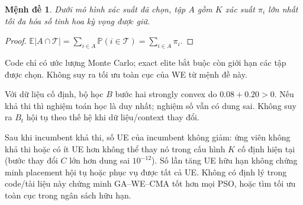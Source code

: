 \documentclass[11pt,a4paper]{article}
\newcommand{\E}{\mathbb E}
\newcommand{\Prob}{\mathbb P}
\newtheorem{proposition}{Mệnh đề}
\begin{document}
\begin{proposition}
Dưới mô hình xác suất đã chọn, tập $A$ gồm $K$ xác suất $\pi_i$ lớn nhất tối đa hóa số tinh hoa kỳ vọng được giữ.
\end{proposition}
\begin{proof}$\E|A\cap\mathcal T|=\sum_{i\in A}\Prob(i\in\mathcal T)=\sum_{i\in A}\pi_i$.\end{proof}
Code chỉ có ước lượng Monte Carlo; exact elite bắt buộc còn giới hạn các tập được chọn. Không suy ra tối ưu toàn cục của WE từ mệnh đề này.

Với dữ liệu cố định, bộ học $B$ bước hai strongly convex do $0.08+0.20>0$. Nếu khả thi thì nghiệm toán học là duy nhất; nghiệm số vẫn có dung sai.
Không suy ra $B_t$ hội tụ theo thế hệ khi dữ liệu/context thay đổi.

Sau khi incumbent khả thi, số UE của incumbent không giảm: ứng viên không khả thi hoặc có ít UE hơn không thể thay nó trong cấu hình $K$ cố định hiện tại (bước thay đổi $C$ lớn hơn dung sai $10^{-12}$).
Số lần tăng UE hữu hạn không chứng minh placement hội tụ hoặc phục vụ được tất cả UE.
Không có định lý trong code/tài liệu này chứng minh GA--WE--CMA tốt hơn mọi PSO, hoặc tìm tối ưu toàn cục trong ngân sách hữu hạn.

\appendix
\end{document}
